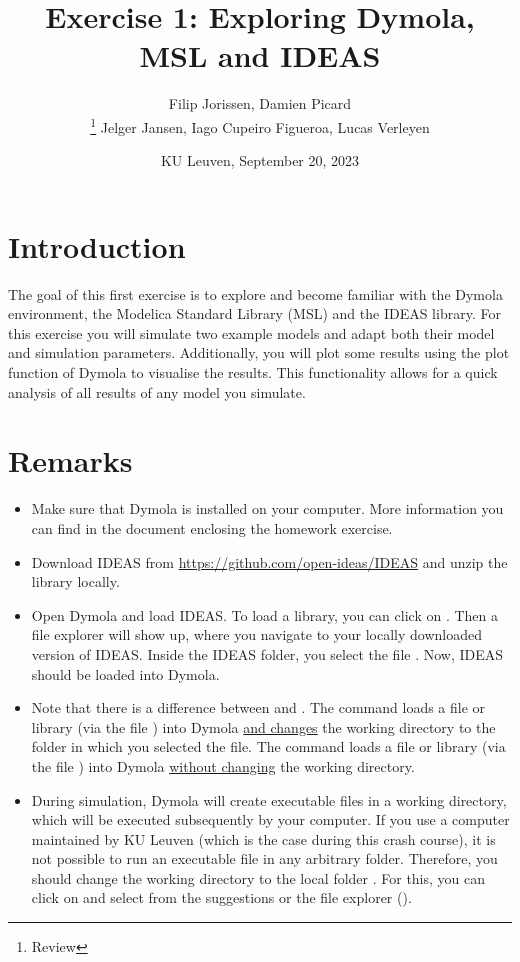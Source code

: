 \documentclass[10pt,a4paper]{article}
\begin{document}
\title{Exercise 1: Exploring Dymola, MSL and IDEAS}
\author{Filip Jorissen, Damien Picard \\  \thanks{Review} Jelger Jansen, Iago Cupeiro Figueroa, Lucas Verleyen}
\date{KU Leuven, September 20, 2023}
\maketitle

\doclicenseThis

\section*{Introduction}
The goal of this first exercise is to explore and become familiar with the Dymola environment, the Modelica Standard Library (MSL) and the IDEAS library. For this exercise you will simulate two example models and adapt both their model and simulation parameters. Additionally, you will plot some results using the plot function of Dymola to visualise the results. This functionality allows for a quick analysis of all results of any model you simulate. 

\section*{Remarks}
 
\begin{itemize}
	\item Make sure that Dymola is installed on your computer. More information you can find in the document enclosing the homework exercise.
	\item Download IDEAS from \href{https://github.com/open-ideas/IDEAS}{https://github.com/open-ideas/IDEAS} and unzip the library locally.
	\item Open Dymola and load IDEAS. To load a library, you can click on . Then a file explorer will show up, where you navigate to your locally downloaded version of IDEAS. Inside the IDEAS folder, you select the file . Now, IDEAS should be loaded into Dymola.
	\item Note that there is a difference between  and . The command  loads a file or library (via the file ) into Dymola \underline{and changes} the working directory to the folder in which you selected the file. The command  loads a file or library (via the file ) into Dymola \underline{without changing} the working directory.
	\item During simulation, Dymola will create executable files in a working directory, which will be executed subsequently by your computer. If you use a computer maintained by KU Leuven (which is the case during this crash course), it is not possible to run an executable file in any arbitrary folder. Therefore, you should change the working directory to the local folder . For this, you can click on  and select  from the suggestions or the file explorer ().
\end{itemize}
\end{document}
